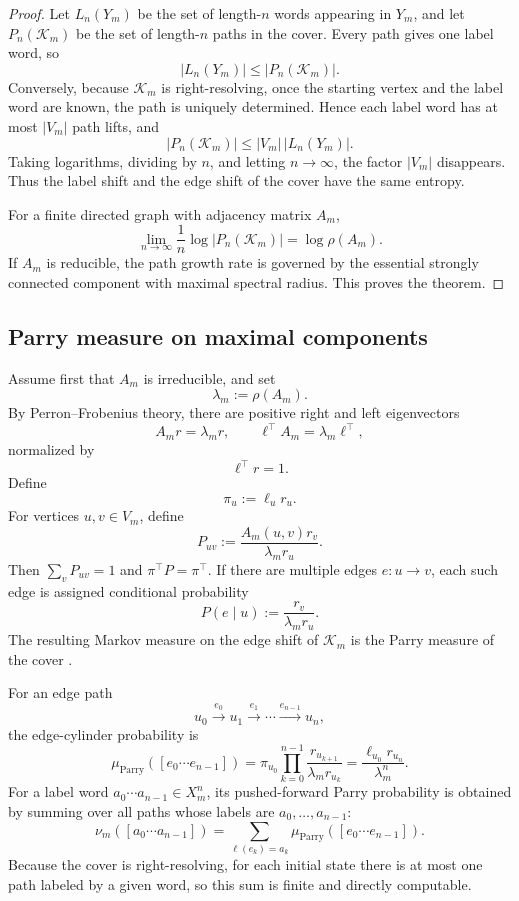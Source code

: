 \begin{proof}
Let \(L_n(Y_m)\) be the set of length-\(n\) words appearing in \(Y_m\), and let \(P_n(\mathcal K_m)\) be the set of length-\(n\) paths in the cover.  Every path gives one label word, so
\[
|L_n(Y_m)|\le |P_n(\mathcal K_m)|.
\]
Conversely, because \(\mathcal K_m\) is right-resolving, once the starting vertex and the label word are known, the path is uniquely determined.  Hence each label word has at most \(|V_m|\) path lifts, and
\[
|P_n(\mathcal K_m)|\le |V_m|\,|L_n(Y_m)|.
\]
Taking logarithms, dividing by \(n\), and letting \(n\to\infty\), the factor \(|V_m|\) disappears.  Thus the label shift and the edge shift of the cover have the same entropy.

For a finite directed graph with adjacency matrix \(A_m\),
\[
\lim_{n\to\infty}\frac1n\log |P_n(\mathcal K_m)|=\log\rho(A_m).
\]
If \(A_m\) is reducible, the path growth rate is governed by the essential strongly connected component with maximal spectral radius.  This proves the theorem.
\end{proof}

\subsection{Parry measure on maximal components}

Assume first that \(A_m\) is irreducible, and set
\[
\lambda_m:=\rho(A_m).
\]
By Perron--Frobenius theory, there are positive right and left eigenvectors
\[
A_m r=\lambda_m r,
\qquad
\ell^\top A_m=\lambda_m\ell^\top,
\]
normalized by
\[
\ell^\top r=1.
\]
Define
\[
\pi_u:=\ell_u r_u.
\]
For vertices \(u,v\in V_m\), define
\[
P_{uv}:=\frac{A_m(u,v)r_v}{\lambda_m r_u}.
\]
Then \(\sum_vP_{uv}=1\) and \(\pi^\top P=\pi^\top\).  If there are multiple edges \(e:u\to v\), each such edge is assigned conditional probability
\[
P(e\mid u):=\frac{r_v}{\lambda_m r_u}.
\]
The resulting Markov measure on the edge shift of \(\mathcal K_m\) is the Parry measure of the cover \cite{Parry1964}.

For an edge path
\[
u_0\xrightarrow{e_0}u_1\xrightarrow{e_1}\cdots
\xrightarrow{e_{n-1}}u_n,
\]
the edge-cylinder probability is
\[
\mu_{\mathrm{Parry}}([e_0\cdots e_{n-1}])
=
\pi_{u_0}\prod_{k=0}^{n-1}\frac{r_{u_{k+1}}}{\lambda_m r_{u_k}}
=
\frac{\ell_{u_0}r_{u_n}}{\lambda_m^n}.
\]
For a label word \(a_0\cdots a_{n-1}\in X_m^n\), its pushed-forward Parry probability is obtained by summing over all paths whose labels are \(a_0,\ldots,a_{n-1}\):
\[
\nu_m([a_0\cdots a_{n-1}])
=
\sum_{\ell(e_k)=a_k}
\mu_{\mathrm{Parry}}([e_0\cdots e_{n-1}]).
\]
Because the cover is right-resolving, for each initial state there is at most one path labeled by a given word, so this sum is finite and directly computable.

